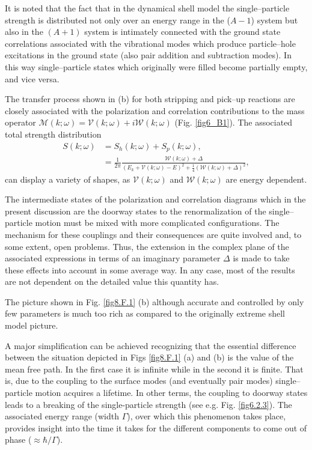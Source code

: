 \begin{subappendices}
It is noted that the fact that in the dynamical shell model the single--particle strength is distributed not only over an energy range in the ($A-1$) system but also in the $(A+1)$ system is intimately connected with the ground state correlations associated with the vibrational modes which produce particle--hole excitations in the ground state (also pair addition and subtraction modes). In this way single--particle states which originally were filled become partially empty, and vice versa.


The transfer process shown in (b) for both stripping and pick--up reactions are closely associated with the polarization and correlation contributions to the mass operator $\mathcal M(k;\omega)=\mathcal V(k;\omega)+i\mathcal W(k;\omega)$ (Fig. \ref{fig6_B1}). The associated total strength distribution
 \begin{align}
 \nonumber S(k;\omega)&=S_h(k;\omega)+S_p(k;\omega),\\
 &=\frac{1}{2\pi}\frac{\mathcal W(k;\omega)+\Delta}{(E_k+\mathcal V(k;\omega)-E)^2+\frac{1}{4}\left(\mathcal W(k;\omega)+\Delta\right)^2},
 \end{align}
can display a variety of shapes, as $\mathcal V(k;\omega)$ and $\mathcal W(k;\omega)$ are energy dependent.


The intermediate states of the polarization and correlation diagrams which in the present discussion are the doorway states to the renormalization of the single--particle motion must be mixed with more complicated configurations. The mechanism for these couplings and their consequences are quite involved and, to some extent, open problems. Thus, the extension in the complex plane of the associated expressions in terms of an imaginary parameter $\Delta$ is made to take these effects into account in some average way. In any case, most of the results are not dependent on the detailed value this quantity has. 


The picture shown in Fig. \ref{fig8.F.1} (b) although accurate and controlled by only few parameters is much too rich as compared to the originally extreme shell model picture.


A major simplification can be achieved recognizing that the essential difference between the situation depicted in Figs \ref{fig8.F.1} (a) and (b) is the value of the mean free path. In the first case it is infinite while in the second it is finite. That is, due to the coupling to the surface modes (and eventually pair modes) single--particle motion acquires a lifetime. In other terms, the coupling to doorway states leads to a breaking of the single-particle strength (see e.g. Fig. \ref{fig6.2.3}). The associated energy range (width $\Gamma$), over which this phenomenon takes place, provides insight into the time it takes for the different components to come out of phase ($\approx \hbar/\Gamma$). 


\end{subappendices}
